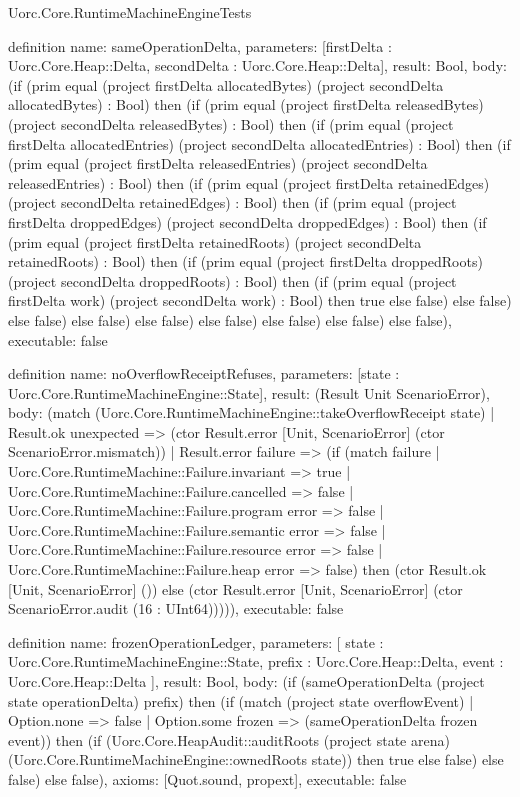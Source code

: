 \begin{lexlean}{Uorc.Core.RuntimeMachineEngineTests}
\begin{semanticmodule}
definition{
  name: sameOperationDelta,
  parameters: [firstDelta : Uorc.Core.Heap::Delta, secondDelta : Uorc.Core.Heap::Delta],
  result: Bool,
  body: (if (prim equal (project firstDelta allocatedBytes) (project secondDelta allocatedBytes) : Bool) then (if (prim equal (project firstDelta releasedBytes) (project secondDelta releasedBytes) : Bool) then (if (prim equal (project firstDelta allocatedEntries) (project secondDelta allocatedEntries) : Bool) then (if (prim equal (project firstDelta releasedEntries) (project secondDelta releasedEntries) : Bool) then (if (prim equal (project firstDelta retainedEdges) (project secondDelta retainedEdges) : Bool) then (if (prim equal (project firstDelta droppedEdges) (project secondDelta droppedEdges) : Bool) then (if (prim equal (project firstDelta retainedRoots) (project secondDelta retainedRoots) : Bool) then (if (prim equal (project firstDelta droppedRoots) (project secondDelta droppedRoots) : Bool) then (if (prim equal (project firstDelta work) (project secondDelta work) : Bool) then true else false) else false) else false) else false) else false) else false) else false) else false) else false),
  executable: false
}

definition{
  name: noOverflowReceiptRefuses,
  parameters: [state : Uorc.Core.RuntimeMachineEngine::State],
  result: (Result Unit ScenarioError),
  body: (match (Uorc.Core.RuntimeMachineEngine::takeOverflowReceipt state)
    | Result.ok unexpected => (ctor Result.error [Unit, ScenarioError] (ctor ScenarioError.mismatch))
    | Result.error failure => (if (match failure
      | Uorc.Core.RuntimeMachine::Failure.invariant => true
      | Uorc.Core.RuntimeMachine::Failure.cancelled => false
      | Uorc.Core.RuntimeMachine::Failure.program error => false
      | Uorc.Core.RuntimeMachine::Failure.semantic error => false
      | Uorc.Core.RuntimeMachine::Failure.resource error => false
      | Uorc.Core.RuntimeMachine::Failure.heap error => false) then (ctor Result.ok [Unit, ScenarioError] ()) else (ctor Result.error [Unit, ScenarioError] (ctor ScenarioError.audit (16 : UInt64))))),
  executable: false
}

definition{
  name: frozenOperationLedger,
  parameters: [
    state : Uorc.Core.RuntimeMachineEngine::State,
    prefix : Uorc.Core.Heap::Delta,
    event : Uorc.Core.Heap::Delta
  ],
  result: Bool,
  body: (if (sameOperationDelta (project state operationDelta) prefix) then (if (match (project state overflowEvent)
    | Option.none => false
    | Option.some frozen => (sameOperationDelta frozen event)) then (if (Uorc.Core.HeapAudit::auditRoots (project state arena) (Uorc.Core.RuntimeMachineEngine::ownedRoots state)) then true else false) else false) else false),
  axioms: [Quot.sound, propext],
  executable: false
}


\end{semanticmodule}
\end{lexlean}
